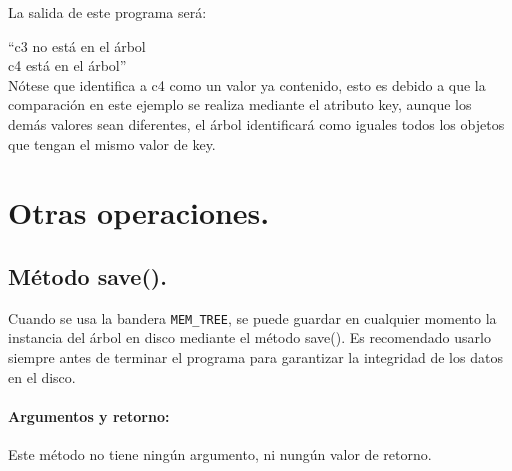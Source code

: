 \documentclass{book}
\begin{document}
La salida de este programa será:

``c3 no está en el árbol\\
\indent c4 está en el árbol''\\

Nótese que identifica a c4 como un valor ya contenido, esto es debido a que la comparación en este ejemplo se realiza mediante el atributo key, aunque los demás valores sean diferentes, el árbol identificará como iguales todos los objetos que tengan el mismo valor de key.

\section{Otras operaciones.}

\subsection{Método save().}
Cuando se usa la bandera \verb+MEM_TREE+, se puede guardar en cualquier momento la instancia del árbol en disco mediante el método save(). Es recomendado usarlo siempre antes de terminar el programa para garantizar la integridad de los datos en el disco.

\paragraph{Argumentos y retorno:}
Este método no tiene ningún argumento, ni nungún valor de retorno.
\end{document}
